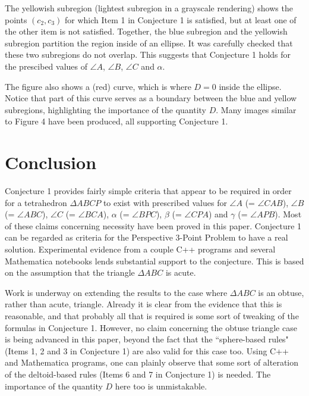 \documentclass[a4paper, twoside]{article}
\begin{document}
The yellowish subregion (lightest subregion in a grayscale rendering) shows the points $(c_2, c_3)$ for which Item 1 in Conjecture 1 is satisfied, but at least one of the other item is not satisfied. Together, the blue subregion and the yellowish subregion partition the region inside of an ellipse. It was carefully checked that these two subregions do not overlap. This suggests that Conjecture 1 holds for the prescibed values of $\angle A$, $\angle B$, $\angle C$ and $\alpha$. 

The figure also shows a (red) curve, which is where $D = 0$ inside the ellipse. Notice that part of this curve serves as a boundary between the blue and yellow subregions, highlighting the importance of the quantity $D$. Many images similar to Figure 4 have been produced, all supporting Conjecture 1. 


\section{Conclusion} 

Conjecture 1 provides fairly simple criteria that appear to be required in order for a tetrahedron $\Delta ABCP$ to exist with prescribed values for $\angle A$ (= $\angle CAB$), $\angle B$ (= $\angle ABC$), $\angle C$ (= $\angle BCA$), $\alpha$ (= $\angle BPC$),  $\beta$ (= $\angle CPA$) and $\gamma$ (= $\angle APB$). Most of these claims concerning necessity have been proved in this paper. Conjecture 1 can be regarded as criteria for the Perspective 3-Point Problem to have a real solution. Experimental evidence from a couple C++ programs and several Mathematica notebooks lends substantial support to the conjecture. This is based on the assumption that the triangle $\Delta ABC$ is acute. 

Work is underway on extending the results to the case where $\Delta ABC$ is an obtuse, rather than acute, triangle. Already it is clear from the evidence that this is reasonable, and that probably all that is required is some sort of tweaking of the formulas in Conjecture 1. However, no claim concerning the obtuse triangle case is being advanced in this paper, beyond the fact that the ``sphere-based rules" (Items 1, 2 and 3 in Conjecture 1) are also valid for this case too. Using C++ and Mathematica programs, one can plainly observe that some sort of alteration of the deltoid-based rules (Items 6 and 7 in Conjecture 1) is needed. The importance of the quantity $D$ here too is unmistakable.   \\
\end{document}
